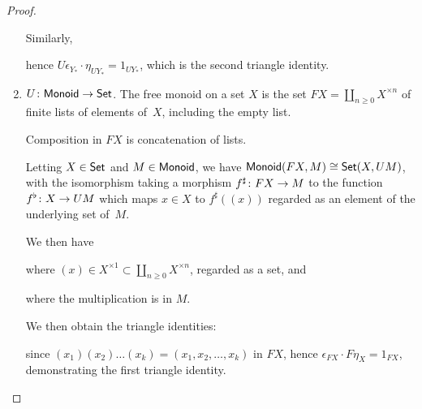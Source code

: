 \documentclass[../../solutions]{subfiles}
\begin{document}
\begin{proof}
\begin{enumerate}[label=(\roman*)]
    Similarly,
    \begin{center}
    \end{center}
    hence $U\epsilon_{Y_*}\cdot \eta_{UY_*}=1_{UY_*}$, which is the
    second triangle identity.

  \item ${U}\colon{\ensuremath{\mathsf{Monoid}}}\to{\ensuremath{\mathsf{Set}}}$.  The free monoid on a set $X$
    is the set $FX=\coprod_{n\ge0} X^{\times n}$ of finite lists of
    elements of~$X$, including the empty list.

    Composition in $FX$ is concatenation of lists.

    Letting $X\in\mathsf{Set}$ and $M\in\mathsf{Monoid}$, we have
    $\mathsf{Monoid}(FX, M)\cong \mathsf{Set}(X,UM)$, with the isomorphism taking a
    morphism ${f^\sharp}\colon{FX}\to{M}$ to the function
    ${f^\flat}\colon{X}\to{UM}$ which maps $x\in X$ to $f^\sharp((x))$
    regarded as an element of the underlying set of~$M$.

    We then have
    \begin{center}
    \end{center}
    where $(x)\in X^{\times1}\subset \coprod_{n\ge0} X^{\times n}$,
    regarded as a set, and
    \begin{center}
    \end{center}
    where the multiplication is in $M$.

    We then obtain the triangle identities:
    \begin{center}
    \end{center}
    since $(x_1)(x_2)\dots(x_k)=(x_1,x_2,\dots,x_k)$ in $FX$, hence
    $\epsilon_{FX}\cdot F\eta_X=1_{FX}$, demonstrating the first
    triangle identity.


\end{enumerate}
\end{proof}
\end{document}
